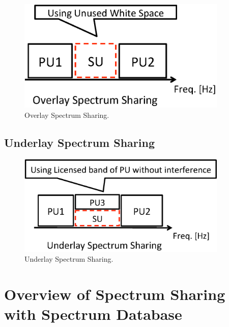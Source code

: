 \begin{figure}[!htp]
\begin{center}
\includegraphics[width=100mm,clip]{overlay.eps}
\caption{Overlay Spectrum Sharing.}
\label{fig:overlay}
\end{center}
\end{figure}

\subsection{Underlay Spectrum Sharing}

\begin{figure}[!htp]
\begin{center}
\includegraphics[width=100mm,clip]{underlay.eps}
\caption{Underlay Spectrum Sharing.}
\label{fig:underlay}
\end{center}
\end{figure}

\section{Overview of Spectrum Sharing with Spectrum Database}
